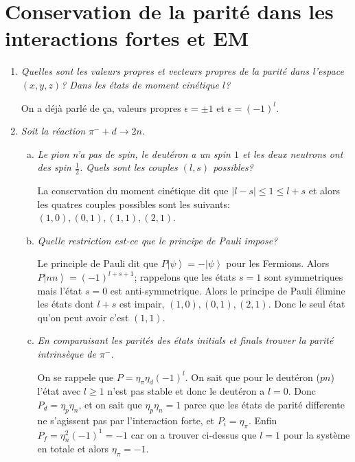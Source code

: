 \documentclass[10pt]{report}
\newcommand{\ket}[1]{\left|#1\right>}
\newcommand{\abs}[1]{\left|#1\right|}
\begin{document}
\section{Conservation de la parit\'e dans les interactions fortes et EM}
\begin{enumerate}[1.]
    \item \emph{Quelles sont les valeurs propres et vecteurs propres de la parit\'e dans l'espace $(x,y,z)$? Dans les \'etats de moment cin\'etique $l$?}

        On a d\'ej\`a parl\'e de \c{c}a, valeurs propres $\epsilon = \pm 1$ et $\epsilon = \left( -1 \right)^l$. 

    \item \emph{Soit la r\'eaction $\pi^- + d \to 2n$.}
        \begin{enumerate}[a)]
            \item \emph{Le pion n'a pas de spin, le deut\'eron a un spin $1$ et les deux neutrons ont des spin $\frac{1}{2}$. Quels sont les couples $(l,s)$ possibles?}

                La conservation du moment cin\'etique dit que $\abs{l-s} \leq 1 \leq l+s$ et alors les quatres couples possibles sont les suivants: $(1,0), (0,1), (1,1), (2,1)$. 

            \item \emph{Quelle restriction est-ce que le principe de Pauli impose?}

                Le principle de Pauli dit que $P\ket{\psi} = -\ket{\psi}$ pour les Fermions. Alors $P\ket{nn} = \left( -1 \right)^{l + s + 1}$; rappelons que les \'etats $s=1$ sont symmetriques mais l'\'etat $s=0$ est anti-symmetrique. Alors le principe de Pauli \'elimine les \'etats dont $l+s$ est impair, $(1,0),(0,1), (2,1)$. Donc le seul \'etat qu'on peut avoir c'est $(1,1)$. 

            \item \emph{En comparaisant les parit\'es des \'etats initials et finals trouver la parit\'e intrins\`eque de $\pi^-$.}

                On se rappele que $P = \eta_\pi \eta_d \left( -1 \right)^l$. On sait que pour le deut\'eron ($pn$) l'\'etat avec $l \geq 1$ n'est pas stable et donc le deut\'eron a $l=0$. Donc $P_d = \eta_p\eta_n$, et on sait que $\eta_p \eta_n = 1$ parce que les \'etats de parit\'e differente ne s'agissent pas par l'interaction forte, et $P_i = \eta_\pi$. Enfin $P_f = \eta_n^2 \left( -1 \right)^{1}= -1$ car on a trouver ci-dessus que $l=1$ pour la syst\`eme en totale et alors $\eta_\pi = -1$.
        \end{enumerate}


\end{enumerate}
\end{document}
